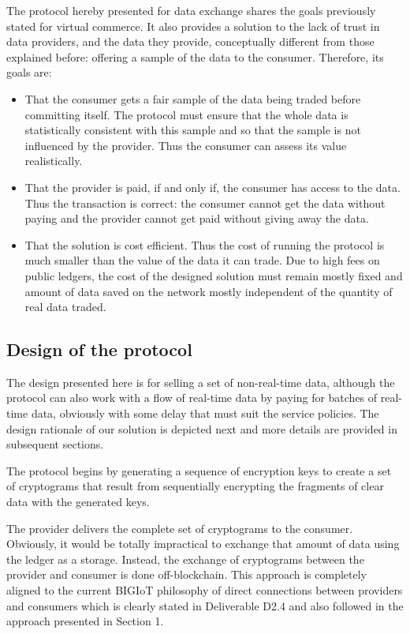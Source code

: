 \documentclass[]{article}
\begin{document}
	The protocol hereby presented for data exchange shares the goals previously stated for virtual commerce. It also provides a solution to the lack of trust in data providers, and the data they provide, conceptually different from those explained before: offering a sample of the data to the consumer. Therefore, its goals are:
	
	\begin{itemize}
		\item That the consumer gets a fair sample of the data being traded before committing itself. The protocol must ensure that the whole data is statistically consistent with this sample and so that the sample is not influenced by the provider. Thus the consumer can assess its value realistically.
		\item That the provider is paid, if and only if, the consumer has access to the data. Thus the transaction is correct: the consumer cannot get the data without paying and the provider cannot get paid without giving away the data.
		\item That the solution is cost efficient. Thus the cost of running the protocol is much smaller than the value of the data it can trade. Due to high fees on public ledgers, the cost of the designed solution must remain mostly fixed and amount of data saved on the network mostly independent of the quantity of real data traded.
	\end{itemize}

	\subsection{Design of the protocol}
	The design presented here is for selling a set of non-real-time data, although the protocol can also work with a flow of real-time data by paying for batches of real-time data, obviously with some delay that must suit the service policies. The design rationale of our solution is depicted next and more details are provided in subsequent sections.

	The protocol begins by generating a sequence of encryption keys to create a set of cryptograms that result from sequentially encrypting the fragments of clear data with the generated keys.

	The provider delivers the complete set of cryptograms to the consumer. Obviously, it would be totally impractical to exchange that amount of data using the ledger as a storage. Instead, the exchange of cryptograms between the provider and consumer is done off-blockchain. This approach is completely aligned to the current BIGIoT philosophy of direct connections between providers and consumers which is clearly stated in Deliverable D2.4 and also followed in the approach presented in Section 1.
\end{document}
